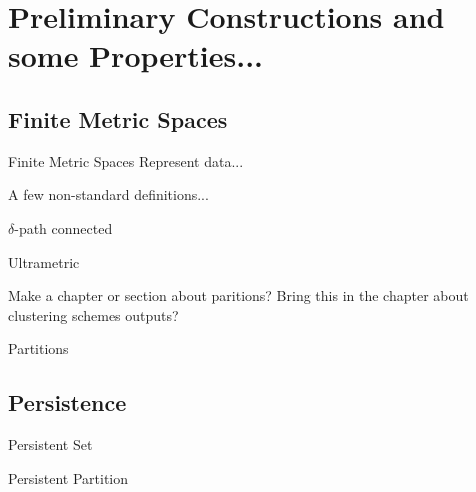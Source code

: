 \chapter{Preliminary Constructions and some Properties...}

\section{Finite Metric Spaces}

Finite Metric Spaces Represent data...

A few non-standard definitions...

\begin{definition}{$\delta$-path connected}{}
\end{definition}

\begin{definition}{Ultrametric}{}
\end{definition}


\todo Make a chapter or section about paritions? Bring this in the chapter about clustering schemes outputs?

\begin{definition}{Partitions}{}
\end{definition}

\section{Persistence}

\begin{definition}{Persistent Set}{}
\end{definition}

\begin{definition}{Persistent Partition}{}
\end{definition}